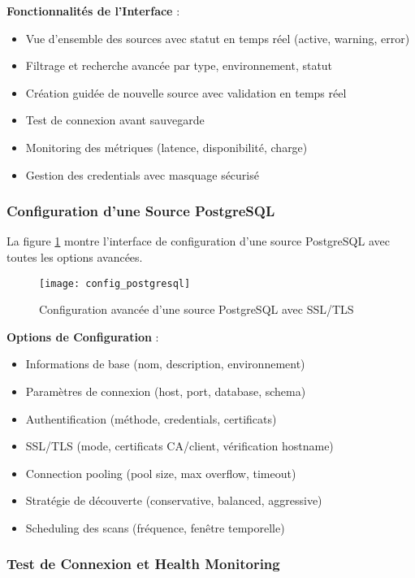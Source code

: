 \textbf{Fonctionnalités de l'Interface} :
\begin{itemize}
    \item Vue d'ensemble des sources avec statut en temps réel (active, warning, error)
    \item Filtrage et recherche avancée par type, environnement, statut
    \item Création guidée de nouvelle source avec validation en temps réel
    \item Test de connexion avant sauvegarde
    \item Monitoring des métriques (latence, disponibilité, charge)
    \item Gestion des credentials avec masquage sécurisé
\end{itemize}

\subsubsection{Configuration d'une Source PostgreSQL}

La figure \ref{fig:config_postgresql} montre l'interface de configuration d'une source PostgreSQL avec toutes les options avancées.

\begin{figure}[htpb]
\centering
\texttt{[image: config\_postgresql]}
\caption{Configuration avancée d'une source PostgreSQL avec SSL/TLS}
\label{fig:config_postgresql}
\end{figure}

\textbf{Options de Configuration} :
\begin{itemize}
    \item Informations de base (nom, description, environnement)
    \item Paramètres de connexion (host, port, database, schema)
    \item Authentification (méthode, credentials, certificats)
    \item SSL/TLS (mode, certificats CA/client, vérification hostname)
    \item Connection pooling (pool size, max overflow, timeout)
    \item Stratégie de découverte (conservative, balanced, aggressive)
    \item Scheduling des scans (fréquence, fenêtre temporelle)
\end{itemize}

\subsubsection{Test de Connexion et Health Monitoring}

